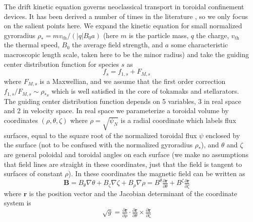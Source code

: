 \documentclass[11pt]{article}
\begin{document}
The drift kinetic equation \cite{hazeltine_recursive_1973} governs neoclassical
transport in toroidal
confinement devices. It has been derived a number of times in the literature
\cite{helander_collisional_2005, hinton_theory_1976}, so we only focus on the
salient points here. We expand the kinetic
equation for small normalized gyroradius $\rho_* = m v_{\mathrm{th}} / (|q| B_0 a)$
(here $m$ is the particle mass, $q$ the charge, $v_{\mathrm{th}}$ the thermal speed,
$B_0$ the average field strength, and $a$ some characteristic macroscopic
length scale, taken here to be the minor radius) and take the guiding center
distribution function for species $s$ as
\begin{equation}
f_s = f_{1,s} + F_{M,s}
\end{equation}
where $F_{M,s}$ is a Maxwellian, and we assume that the first order correction
$f_{1,s}/F_{M,s} \sim \rho_{*s}$ which is well satisfied in the core of tokamaks
and stellarators. The guiding center distribution function depends on 5
variables, 3 in real space and 2 in velocity space. In real space we
parameterize a toroidal volume by coordinates $(\rho, \theta, \zeta)$ where
$\rho = \sqrt{\psi_N}$ is a radial coordinate which labels flux surfaces, equal
to the square root of the normalized toroidal flux $\psi$ enclosed by the
surface (not to be confused with the normalized gyroradius $\rho_*$), and
$\theta$ and $\zeta$ are general poloidal and toroidal angles on each surface
(we make no assumptions that field lines are straight in these coordinates,
just that the field is tangent to surfaces of constant $\rho$). In these
coordinates the magnetic field can be written as
\begin{equation}
\mathbf{B} = B_\theta \nabla \theta + B_\zeta \nabla \zeta + B_\rho \nabla \rho
= B^\theta \tfrac{\partial \mathbf{r}}{\partial \theta}
+ B^\zeta \tfrac{\partial \mathbf{r}}{\partial \zeta}
\end{equation}
where $\mathbf{r}$ is the position vector and the Jacobian determinant of the coordinate
system is
\begin{equation}
\sqrt{g} = \tfrac{\partial \mathbf{r}}{\partial \rho} \cdot
\tfrac{\partial \mathbf{r}}{\partial \theta} \times
\tfrac{\partial \mathbf{r}}{\partial \zeta}
\end{equation}
\end{document}

